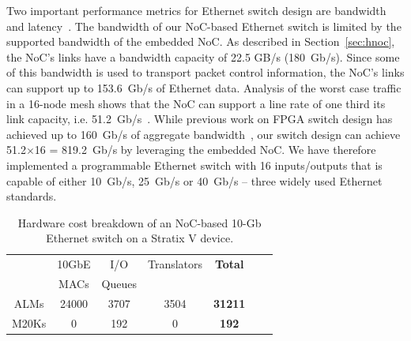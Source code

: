 Two important performance metrics for Ethernet switch design are bandwidth and latency~\cite{elhanany2005network}.
The bandwidth of our NoC-based Ethernet switch is limited by the supported bandwidth of the embedded NoC.
As described in Section~\ref{sec:hnoc}, the NoC's links have a bandwidth capacity of 22.5 GB/s (180~Gb/s).
Since some of this bandwidth is used to transport packet control information, the NoC's links can support up to 153.6~Gb/s of Ethernet data.
Analysis of the worst case traffic in a 16-node mesh shows that the NoC can support a line rate of one third its link capacity, i.e. 51.2~Gb/s~\cite{Bitar2014}.
While previous work on FPGA switch design has achieved up to 160~Gb/s of aggregate bandwidth~\cite{dai-zhu}, our switch design can achieve 51.2$\times$16 = 819.2~Gb/s by leveraging the embedded NoC.
We have therefore implemented a programmable Ethernet switch with 16 inputs/outputs that is capable of either 10~Gb/s, 25~Gb/s or 40~Gb/s -- three widely used Ethernet standards.

%
%
\begin{table}[!t]
\centering
\begin{small}
    \caption{Hardware cost breakdown of an NoC-based 10-Gb Ethernet switch on a Stratix V device.}
    \label{tbl:hcost}
    \begin{tabular}{ccccccc}
    \toprule
     & 10GbE & I/O & Translators & \textbf{Total} \\
     & MACs & Queues &  & & \\
    \midrule
	ALMs & 24000  & 3707 &  3504 & \textbf{31211} \\
	M20Ks & 0    & 192   & 0 & \textbf{192}   \\
    \bottomrule
    \end{tabular}
\end{small}
\end{table}
%
%

